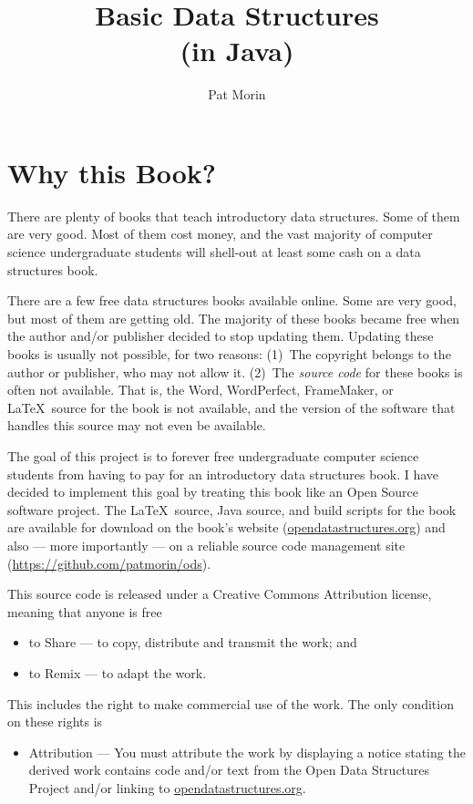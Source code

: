 \documentclass[11pt]{book}
\title{Basic Data Structures\\(in Java)}
\author{Pat Morin}
\begin{document}
\begin{titlepage}
  \maketitle
  \thispagestyle{empty}
\end{titlepage}

\tableofcontents

\newpage
\section*{Why this Book?}

There are plenty of books that teach introductory data structures.
Some of them are very good.  Most of them cost money, and the vast
majority of computer science undergraduate students will shell-out at
least some cash on a data structures book.

There are a few free data structures books available online.  Some are
very good, but most of them are getting old.  The majority of these
books became free when the author and/or publisher decided to stop
updating them.  Updating these books is usually not possible, for two
reasons:  (1)~The copyright belongs to the author or publisher, who
may not allow it.  (2)~The \emph{source code} for these books is often
not available.  That is, the Word, WordPerfect, FrameMaker, or \LaTeX\
source for the book is not available, and the version of the software
that handles this source may not even be available.

The goal of this project is to forever free undergraduate computer science
students from having to pay for an introductory data structures book.
I have decided to implement this goal by treating this book like an
Open Source software project.  The \LaTeX\ source, Java source, and
build scripts for the book are available for download on the book's website
(\url{opendatastructures.org}) and also --- more importantly --- on a reliable
source code management site (\url{https://github.com/patmorin/ods}).

This source code is released under a Creative Commons Attribution license,
meaning that anyone is free
\begin{itemize}
  \item to Share --- to copy, distribute and transmit the work; and
  \item to Remix --- to adapt the work.
\end{itemize}
This includes the right to make commercial use of the work.  The only
condition on these rights is
\begin{itemize}
  \item Attribution --- You must attribute the work by displaying a
  notice stating the derived work contains code and/or text from the
  Open Data Structures Project and/or linking to
  \url{opendatastructures.org}.
\end{itemize}
\end{document}
